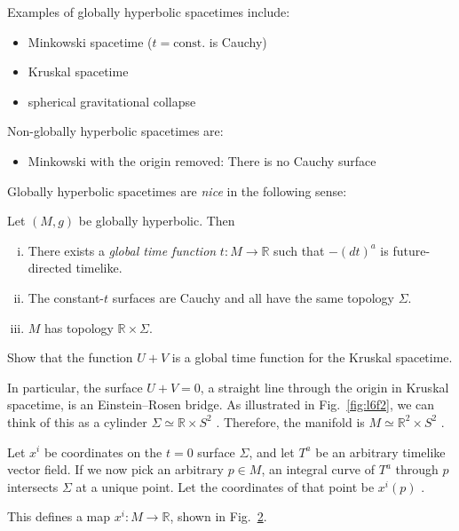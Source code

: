 
Examples of globally hyperbolic spacetimes include:
\begin{itemize}
  \item Minkowski spacetime ($t = \text{const.}$ is Cauchy)
  \item Kruskal spacetime
  \begin{figure}[tbhp]
    \centering
    \def\svgwidth{0.4\columnwidth}
    
    \caption{}
    \label{fig:l7f1}
  \end{figure}
  \item spherical gravitational collapse %
\end{itemize}

Non-globally hyperbolic spacetimes are:
\begin{itemize}
  \item Minkowski with the origin removed: There is no Cauchy surface %
\end{itemize}

Globally hyperbolic spacetimes are \emph{nice} in the following sense:
\begin{theorem}[]
  Let $(M, g)$ be globally hyperbolic. Then 
  \begin{enumerate}[(i)]
    \item There exists a \emph{global time function} $t \colon M \to \mathbb{R}$ such that $-(dt)^{a}$ is future-directed timelike.
    \item The constant-$t$ surfaces are Cauchy and all have the same topology $\Sigma$.
    \item $M$ has topology $\mathbb{R} \times \Sigma$.
  \end{enumerate}
\end{theorem}

\begin{exercise}
  Show that the function $U + V$ is a global time function for the Kruskal spacetime.
\end{exercise}
In particular, the surface $U + V = 0$, a straight line through the origin in Kruskal spacetime, is an Einstein--Rosen bridge. As illustrated in Fig.~\ref{fig:l6f2}, we can think of this as a cylinder $\Sigma \simeq \mathbb{R} \times S^2$ . Therefore, the manifold is $M \simeq \mathbb{R}^2 \times S^2$ .

Let $x^{i}$  be coordinates on the $t = 0$ surface $\Sigma$, and let  $T^{a}$  be an arbitrary timelike vector field.
If we now pick an arbitrary $p \in M$, an integral curve of  $T^{a}$  through $p$  intersects $\Sigma$  at a unique point. Let the coordinates of that point be $x^{i}(p)$ .
\begin{figure}[tbhp]
  \centering
  \def\svgwidth{0.4\columnwidth}
  
  \caption{}
  \label{fig:l7f4}
\end{figure}
This defines a map $x^{i} \colon M \to \mathbb{R}$, shown in Fig.~\ref{fig:l7f4}.

